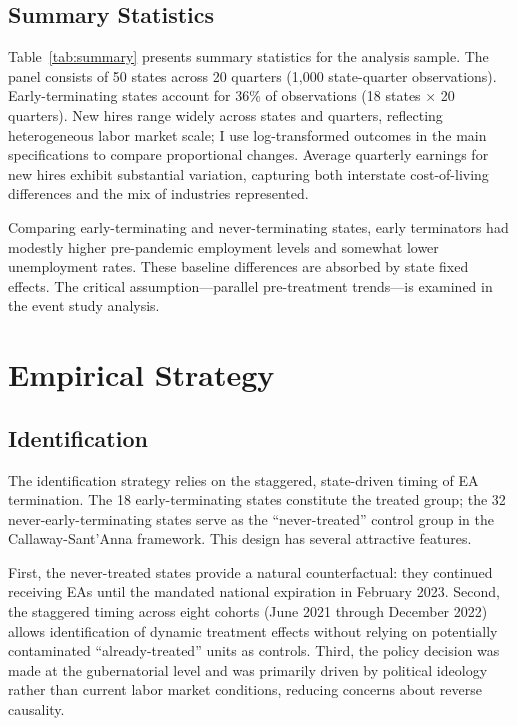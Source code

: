 \documentclass[12pt]{article}
\begin{document}
\subsection{Summary Statistics}



Table~\ref{tab:summary} presents summary statistics for the analysis sample. The panel consists of 50 states across 20 quarters (1,000 state-quarter observations). Early-terminating states account for 36\% of observations (18 states $\times$ 20 quarters). New hires range widely across states and quarters, reflecting heterogeneous labor market scale; I use log-transformed outcomes in the main specifications to compare proportional changes. Average quarterly earnings for new hires exhibit substantial variation, capturing both interstate cost-of-living differences and the mix of industries represented.

Comparing early-terminating and never-terminating states, early terminators had modestly higher pre-pandemic employment levels and somewhat lower unemployment rates. These baseline differences are absorbed by state fixed effects. The critical assumption---parallel pre-treatment trends---is examined in the event study analysis.

\section{Empirical Strategy}

\subsection{Identification}

The identification strategy relies on the staggered, state-driven timing of EA termination. The 18 early-terminating states constitute the treated group; the 32 never-early-terminating states serve as the ``never-treated'' control group in the Callaway-Sant'Anna framework. This design has several attractive features.

First, the never-treated states provide a natural counterfactual: they continued receiving EAs until the mandated national expiration in February 2023. Second, the staggered timing across eight cohorts (June 2021 through December 2022) allows identification of dynamic treatment effects without relying on potentially contaminated ``already-treated'' units as controls. Third, the policy decision was made at the gubernatorial level and was primarily driven by political ideology rather than current labor market conditions, reducing concerns about reverse causality.
\end{document}
